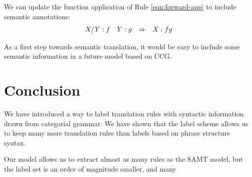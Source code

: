 \documentclass[a4paper]{article}
\newcommand\anonymize[1]{}
\begin{document}
We can update the function application of Rule \ref{eqn:forward-app} to include semantic annotations:
\begin{equation}
\begin{array}{cccc} X/Y:f & Y:g & \Rightarrow & X:fg \end{array}
\end{equation}

As a first step towards semantic translation, it would be easy to include some semantic information in a future model based on CCG. 

\section{Conclusion}

We have introduced a way to label translation rules with syntactic information drawn from categorial grammar. We have shown that the label scheme allows us to keep many more translation rules than labels based on phrase structure syntax.

Our model allows us to extract almost as many rules as the SAMT model, but the label set is an order of magnitude smaller, and many

\anonymize{
\section{Acknowledgements*}
Michael Auli, ???, funding sources
}



\end{document}
